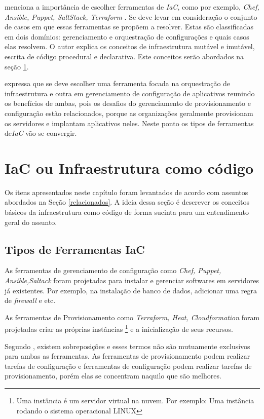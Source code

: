 \hfill

  menciona a importância de escolher ferramentas de \textit{IaC}, como por exemplo,\textit{ Chef, Ansible, Puppet, SaltStack, Terraform }. Se deve levar em consideração o conjunto de casos em que essas ferramentas se propõem a resolver. Estas são classificadas em dois domínios: gerenciamento e orquestração de configurações e quais casos elas resolvem. O autor explica os conceitos de infraestrutura mutável e imutável, escrita de código procedural e declarativa. Este conceitos serão abordados na seção \ref{IaC}. 

 expressa que se deve escolher uma ferramenta focada na orquestração de infraestrutura e outra em gerenciamento de configuração de aplicativos reunindo os benefícios de ambas, pois os desafios do gerenciamento de provisionamento e configuração estão relacionados, porque as organizações geralmente provisionam os servidores e implantam aplicativos neles. Neste ponto os tipos de ferramentas de\textit{IaC} vão se convergir.


\section{\esp IaC ou Infraestrutura como código} \label{IaC}

Os itens apresentados neste capítulo foram levantados de acordo com assuntos abordados na Seção \ref{relacionados}. A ideia dessa seção é descrever os conceitos básicos da infraestrutura como código de forma sucinta para um entendimento geral do assunto.


\subsection{Tipos de Ferramentas IaC} \label{tools_iac}
As ferramentas de gerenciamento de configuração como \textit{Chef, Puppet, Ansible,Saltack} foram projetadas para instalar e gerenciar softwares em servidores já existentes. Por exemplo, na instalação de banco de dados, adicionar uma regra de \textit{firewall} e etc.

As ferramentas de Provisionamento como \textit{Terraform, Heat, Cloudformation} foram projetadas criar as próprias instâncias \footnote{Uma instância é um servidor virtual na nuvem. Por exemplo: Uma instância rodando o sistema operacional LINUX} e a inicialização de seus recursos. 

Segundo , existem sobreposições e esses termos não são mutuamente exclusivos para ambas as ferramentas. As ferramentas de provisionamento podem realizar tarefas de configuração e ferramentas de configuração podem realizar tarefas de provisionamento, porém elas se concentram naquilo que são melhores. 

